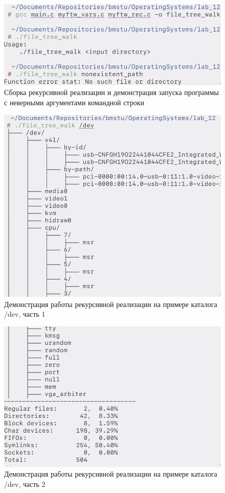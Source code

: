 \begin{figure}[H]
    \centering
    \caption{Сборка рекурсивной реализации и демонстрация запуска программы с неверными аргументами командной строки}
    \includegraphics[scale=0.45]{images/scr_01.png}
\end{figure}
\begin{figure}[H]
    \centering
    \caption{Демонстрация работы рекурсивной реализации на примере каталога /dev, часть 1}
    \includegraphics[scale=0.45]{images/scr_02.png}
\end{figure}
\begin{figure}[H]
    \centering
    \caption{Демонстрация работы рекурсивной реализации на примере каталога /dev, часть 2}
    \includegraphics[scale=1.85]{images/scr_03.png}
\end{figure}
